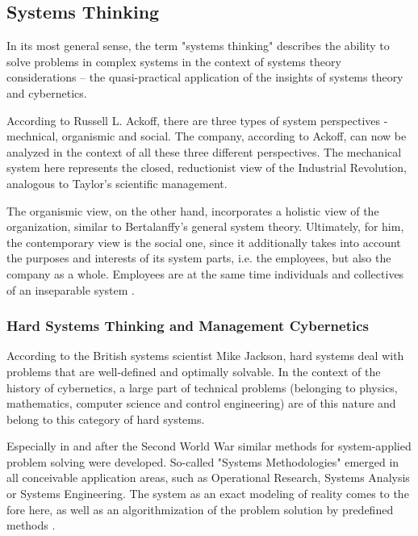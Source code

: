 \documentclass[a4paper,12pt]{article}
\begin{document}
\subsection{Systems Thinking}

In its most general sense, the term "systems thinking" describes the ability
to solve problems in complex systems in the context of systems theory
considerations -- the quasi-practical application of the insights of systems
theory and cybernetics. 

According to Russell L. Ackoff, there are three types of system perspectives -
mechnical, organismic and social. The company, according to Ackoff, can now be
analyzed in the context of all these three different perspectives. The
mechanical system here represents the closed, reductionist view of the
Industrial Revolution, analogous to Taylor's scientific management.

The organismic view, on the other hand, incorporates a holistic view of the
organization, similar to Bertalanffy's general system theory. Ultimately, for
him, the contemporary view is the social one, since it additionally takes into
account the purposes and interests of its system parts, i.e. the employees,
but also the company as a whole. Employees are at the same time individuals
and collectives of an inseparable system \cite{ackoff:1994}.

\subsubsection{Hard Systems Thinking and Management Cybernetics}

According to the British systems scientist Mike Jackson, hard systems deal
with problems that are well-defined and optimally solvable. In the context of
the history of cybernetics, a large part of technical problems (belonging to
physics, mathematics, computer science and control engineering) are of this
nature and belong to this category of hard systems.

Especially in and after the Second World War similar methods for
system-applied problem solving were developed. So-called "Systems
Methodologies" emerged in all conceivable application areas, such as
Operational Research, Systems Analysis or Systems Engineering.  The system as
an exact modeling of reality comes to the fore here, as well as an
algorithmization of the problem solution by predefined methods
\cite{jackson:2003}.
\end{document}
